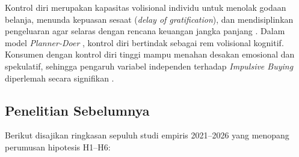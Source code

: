 \documentclass[12pt,a4paper]{article}
\numberwithin{equation}{section}
\numberwithin{table}{section}
\numberwithin{figure}{section}
\begin{document}
Kontrol diri merupakan kapasitas volisional individu untuk menolak godaan belanja, menunda kepuasan sesaat (\emph{delay of gratification}), dan mendisiplinkan pengeluaran agar selaras dengan rencana keuangan jangka panjang \citep{tangney2004high, baumeister2002yield, vohs2007spent}. Dalam model \emph{Planner-Doer} \citep{thaler1981economic}, kontrol diri bertindak sebagai rem volisional kognitif. Konsumen dengan kontrol diri tinggi mampu menahan desakan emosional dan spekulatif, sehingga pengaruh variabel independen terhadap \emph{Impulsive Buying} diperlemah secara signifikan \citep{sultan2012building}.

\subsection{Penelitian Sebelumnya}

Berikut disajikan ringkasan sepuluh studi empiris 2021--2026 yang menopang perumusan hipotesis H1--H6:
\end{document}
